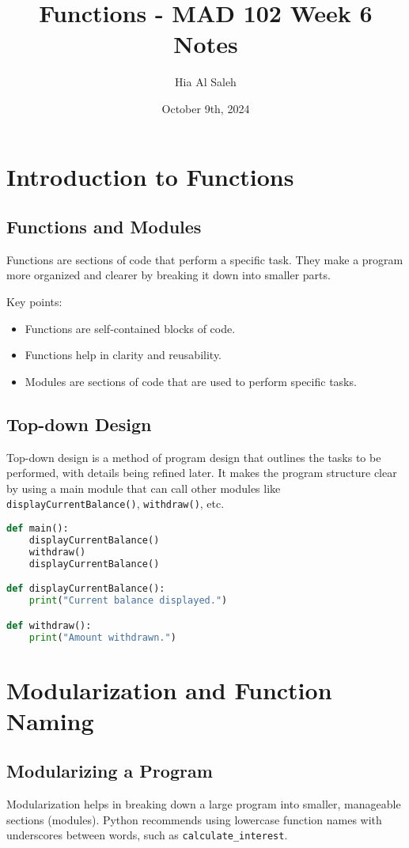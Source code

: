 \documentclass{article}
\title{Functions - MAD 102 Week 6 Notes}
\author{Hia Al Saleh}
\date{October 9th, 2024}
\begin{document}
\maketitle
\tableofcontents
\newpage

\section{Introduction to Functions}

\subsection{Functions and Modules}
Functions are sections of code that perform a specific task. They make a program more organized and clearer by breaking it down into smaller parts. 

Key points:
\begin{itemize}
    \item Functions are self-contained blocks of code.
    \item Functions help in clarity and reusability.
    \item Modules are sections of code that are used to perform specific tasks.
\end{itemize}

\subsection{Top-down Design}
Top-down design is a method of program design that outlines the tasks to be performed, with details being refined later. It makes the program structure clear by using a main module that can call other modules like \lstinline|displayCurrentBalance()|, \lstinline|withdraw()|, etc.

\begin{lstlisting}[language=Python, caption={Example of Top-down Design}]
def main():
    displayCurrentBalance()
    withdraw()
    displayCurrentBalance()

def displayCurrentBalance():
    print("Current balance displayed.")

def withdraw():
    print("Amount withdrawn.")
\end{lstlisting}

\section{Modularization and Function Naming}

\subsection{Modularizing a Program}
Modularization helps in breaking down a large program into smaller, manageable sections (modules). Python recommends using lowercase function names with underscores between words, such as \lstinline|calculate_interest|.
\end{document}
